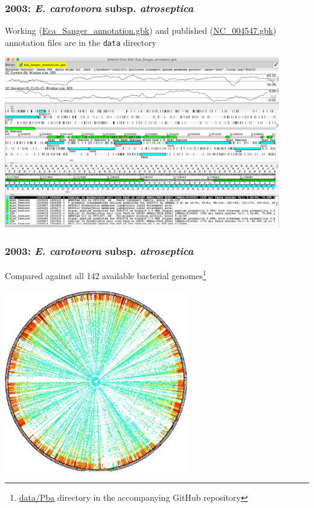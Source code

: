 \begin{frame}
  \frametitle{2003: \textit{E. carotovora} subsp. \textit{atroseptica}}
  Working (\url{Eca_Sanger_annotation.gbk}) and published (\url{NC_004547.gbk}) annotation files are in the \texttt{data} directory
  \begin{center}
    \includegraphics[width=0.9\textwidth]{images/pba_artemis}
  \end{center}    
\end{frame}

\begin{frame}
  \frametitle{2003: \textit{E. carotovora} subsp. \textit{atroseptica}}
  Compared against all 142 available bacterial genomes\footnote{\tiny{\url{data/Pba} directory in the accompanying GitHub repository}}
  \begin{center}
    \includegraphics[width=0.6\textwidth]{images/pba_400_circular}
  \end{center}    
\end{frame}

